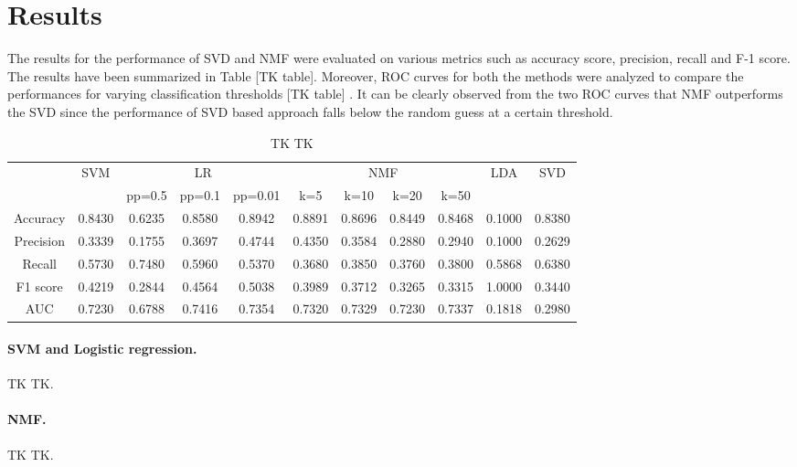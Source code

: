 \documentclass{article} %
\begin{document}
\section{Results}

The results for the performance of SVD and NMF were evaluated on various metrics such as accuracy score, precision, recall and F-1 score. The results have been summarized in Table [TK table]. Moreover, ROC curves for both the methods were analyzed to compare the performances for varying classification thresholds [TK table] . It can be clearly observed from the two ROC curves that NMF outperforms the SVD since the performance of SVD based approach falls below the random guess at a certain threshold.

\begin{table}
\centering
{
\fontsize{10}{14}\selectfont
\noindent\begin{tabular}{ c | c | c c c | c c c c | c | c }
	\hline
	    & \multirow{2}{*}{SVM}
	    & \multicolumn{3}{c|}{LR}
	    & \multicolumn{4}{c|}{NMF}
	    & \multirow{2}{*}{LDA}
	    & \multirow{2}{*}{SVD} \\
	\cline{3-9}
    & & pp=0.5 & pp=0.1 & pp=0.01 & k=5 & k=10 & k=20 & k=50 & & \\
	\hline
	\hline
	Accuracy  & 0.8430 & 0.6235 & 0.8580 & 0.8942 & 0.8891 & 0.8696 & 0.8449 & 0.8468 & 0.1000 & 0.8380 \\
	\hline
	Precision & 0.3339 & 0.1755 & 0.3697 & 0.4744 & 0.4350 & 0.3584 & 0.2880 & 0.2940 & 0.1000 & 0.2629 \\
	\hline
	Recall    & 0.5730 & 0.7480 & 0.5960 & 0.5370 & 0.3680 & 0.3850 & 0.3760 & 0.3800 & 0.5868 & 0.6380 \\
	\hline
	F1 score  & 0.4219 & 0.2844 & 0.4564 & 0.5038 & 0.3989 & 0.3712 & 0.3265 & 0.3315 & 1.0000 & 0.3440 \\
	\hline
	AUC       & 0.7230 & 0.6788 & 0.7416 & 0.7354 & 0.7320 & 0.7329 & 0.7230 & 0.7337 & 0.1818 & 0.2980 \\
	\hline
\end{tabular}
}
\caption{\small TK TK}
\label{tab:standardresults}
\end{table}

\paragraph{SVM and Logistic regression.} TK TK.

\paragraph{NMF.} TK TK.
\end{document}
